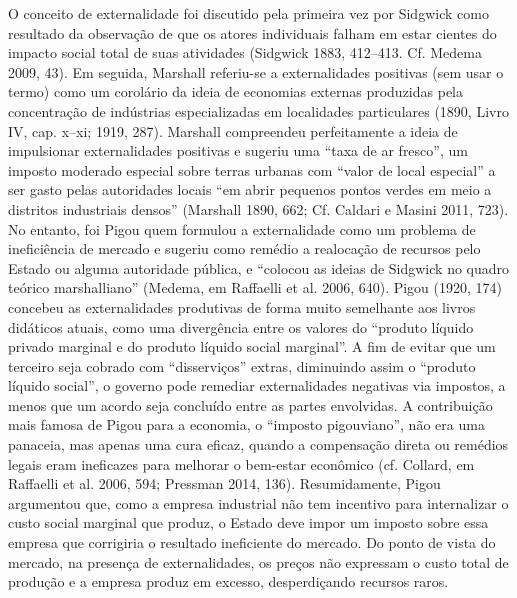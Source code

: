 \documentclass[12pt]{article}
\begin{document}
O conceito de externalidade foi discutido pela primeira vez por Sidgwick como resultado da observação de que os atores individuais falham em estar cientes do impacto social total de suas atividades (Sidgwick 1883, 412–413. Cf. Medema 2009, 43). Em seguida, Marshall referiu-se a externalidades positivas (sem usar o termo) como um corolário da ideia de economias externas produzidas pela concentração de indústrias especializadas em localidades particulares (1890, Livro IV, cap. x–xi; 1919, 287). Marshall compreendeu perfeitamente a ideia de impulsionar externalidades positivas e sugeriu uma “taxa de ar fresco”, um imposto moderado especial sobre terras urbanas com “valor de local especial” a ser gasto pelas autoridades locais “em abrir pequenos pontos verdes em meio a distritos industriais densos” (Marshall 1890, 662; Cf. Caldari e Masini 2011, 723). No entanto, foi Pigou quem formulou a externalidade como um problema de ineficiência de mercado e sugeriu como remédio a realocação de recursos pelo Estado ou alguma autoridade pública, e “colocou as ideias de Sidgwick no quadro teórico marshalliano” (Medema, em Raffaelli et al. 2006, 640). Pigou (1920, 174) concebeu as externalidades produtivas de forma muito semelhante aos livros didáticos atuais, como uma divergência entre os valores do “produto líquido privado marginal e do produto líquido social marginal”. A fim de evitar que um terceiro seja cobrado com “disserviços” extras, diminuindo assim o “produto líquido social”, o governo pode remediar externalidades negativas via impostos, a menos que um acordo seja concluído entre as partes envolvidas. A contribuição mais famosa de Pigou para a economia, o “imposto pigouviano”, não era uma panaceia, mas apenas uma cura eficaz, quando a compensação direta ou remédios legais eram ineficazes para melhorar o bem-estar econômico (cf. Collard, em Raffaelli et al. 2006, 594; Pressman 2014, 136). Resumidamente, Pigou argumentou que, como a empresa industrial não tem incentivo para internalizar o custo social marginal que produz, o Estado deve impor um imposto sobre essa empresa que corrigiria o resultado ineficiente do mercado. Do ponto de vista do mercado, na presença de externalidades, os preços não expressam o custo total de produção e a empresa produz em excesso, desperdiçando recursos raros.
\end{document}
